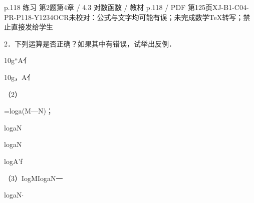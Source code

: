 \begin{bankitem}{p.118 练习 第2题}{第4章 / 4.3 对数函数 / 教材 p.118 / PDF 第125页}{XJ-B1-C04-PR-P118-Y1234}{OCR未校对：公式与文字均可能有误；未完成数学TeX转写；禁止直接发给学生}
\begin{ocrdraft}
\par
2．下列运算是否正确？如果其中有错误，试举出反例．
\par
10g“A亻
\par
10g，A亻
\par
（2）
\par
=loga(M—N)；
\par
logaN
\par
logaN
\par
logA'f
\par
（3）IogMIogaN一
\par
logaN\ensuremath{\cdot}
\end{ocrdraft}
\end{bankitem}
